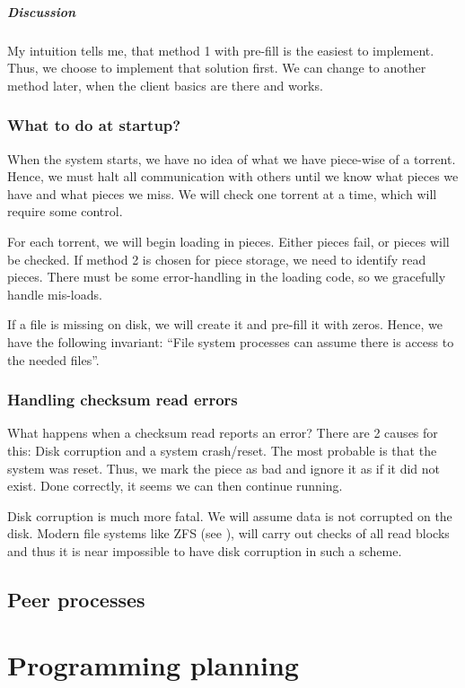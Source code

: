 \documentclass[a4paper]{report}
\begin{document}
\paragraph{Discussion}
My intuition tells me, that method 1 with pre-fill is the easiest to
implement. Thus, we choose to implement that solution first. We can
change to another method later, when the client basics are there and
works.

\subsection{What to do at startup?}
When the system starts, we have no idea of what we have piece-wise of
a torrent. Hence, we must halt all communication with others until we
know what pieces we have and what pieces we miss. We will check one
torrent at a time, which will require some control.

For each torrent, we will begin loading in pieces. Either pieces fail,
or pieces will be checked. If method 2 is chosen for piece storage, we
need to identify read pieces. There must be some error-handling in the
loading code, so we gracefully handle mis-loads.

If a file is missing on disk, we will create it and pre-fill it with
zeros. Hence, we have the following invariant: ``File system processes
can assume there is access to the needed files''.

\subsection{Handling checksum read errors}
What happens when a checksum read reports an error? There are 2 causes
for this: Disk corruption and a system crash/reset. The most probable
is that the system was reset. Thus, we mark the piece as bad and
ignore it as if it did not exist. Done correctly, it seems we can then
continue running.

Disk corruption is much more fatal. We will assume data is not
corrupted on the disk. Modern file systems like ZFS (see \cite{zfs}),
will carry out checks of all read blocks and thus it is near
impossible to have disk corruption in such a scheme.

\section{Peer processes}
\chapter{Programming planning}
\end{document}
